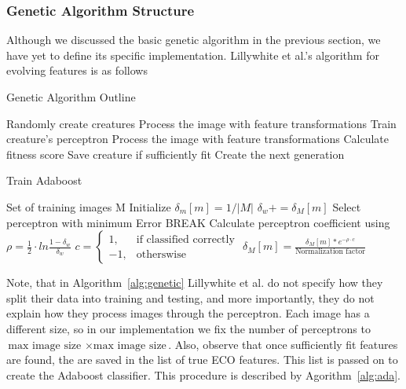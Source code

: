 \documentclass[conference]{IEEEtran}
\begin{document}
\subsubsection{Genetic Algorithm Structure}
Although we discussed the basic genetic algorithm in the previous section, we have yet to define its specific implementation. Lillywhite et al.'s algorithm for evolving features is as follows
\begin{algorithm}[t]
  \caption{Genetic Algorithm Outline}
  \label{alg:genetic}
  \begin{algorithmic}
    \State Randomly create creatures
    \EndFor
    \State Process the image with feature transformations
    \State Train creature's perceptron
    \EndFor
    \State Process the image with feature transformations
    \EndFor
    \State Calculate fitness score
    \State Save creature if sufficiently fit
    \EndFor
    \State Create the next generation
    \EndFor
  \end{algorithmic}
\end{algorithm}

\begin{algorithm}[t]
  \caption{Train Adaboost}
  \label{alg:ada}
  \begin{algorithmic}
    \State Set of training images M
    \State Initialize $\delta_m[m]=1/|M|$
    \EndFor
    \State $\delta_w+=\delta_M[m]$
    \EndIf
    \EndFor
    \EndFor
    \State Select perceptron with minimum Error
    \State BREAK
    \EndIf
    \State Calculate perceptron coefficient using
    \State$\rho=\frac{1}{2} \cdot ln\frac{1-\delta_w}{\delta_w}$
    \State
    $c =
    \begin{cases}
      1, & \text{if classified correctly}\\
      -1, & \text{otherswise}
    \end{cases}$
    \State $\delta_M[m]=\frac{\delta_M[m]*e^{-\rho \cdot c}}{\text{Normalization factor}}$
    \EndFor
    \EndFor
  \end{algorithmic}
\end{algorithm}

Note, that in Algorithm~\ref{alg:genetic} Lillywhite et al. do not specify how they split their data into training and testing, and more importantly, they do not explain how they process images through the perceptron. Each image has a different size, so in our implementation we fix the number of perceptrons to $\text{max image size } \times \text{max image size}$. Also, observe that once sufficiently fit features are found, the are saved in the list of true ECO features. This list is passed on to create the Adaboost classifier. This procedure is described by Agorithm~\ref{alg:ada}.
\end{document}
